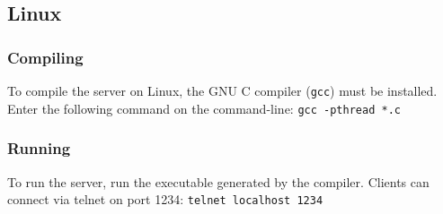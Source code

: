 \documentclass{article}
\begin{document}
\subsection{Linux}

\subsubsection*{Compiling}
To compile the server on Linux, the GNU C compiler (\texttt{gcc}) must be installed. Enter the following command on the command-line:\newline\newline
\texttt{gcc -pthread *.c}
\subsubsection*{Running}
To run the server, run the executable generated by the compiler. Clients can connect via telnet on port 1234:\newline\newline
\texttt{telnet localhost 1234}
\end{document}
